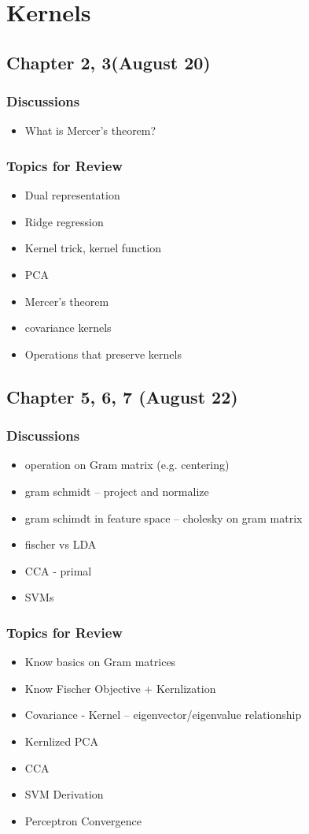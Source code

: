 \section{Kernels}

\subsection{Chapter 2, 3(August 20)}

\subsubsection*{Discussions}
\begin{itemize}
\item What is Mercer's theorem?
\end{itemize}

\subsubsection*{Topics for Review}
\begin{itemize}
\item Dual representation
\item Ridge regression
\item Kernel trick, kernel function
\item PCA
\item Mercer's theorem
\item covariance kernels
\item Operations that preserve kernels
\end{itemize}

\subsection{Chapter 5, 6, 7 (August 22)}

\subsubsection*{Discussions}
\begin{itemize}
\item operation on Gram matrix (e.g. centering)
\item gram schmidt -- project and normalize
\item gram schimdt in feature space -- cholesky on gram matrix
\item fischer vs LDA
\item CCA - primal
\item SVMs
\end{itemize}

\subsubsection*{Topics for Review}
\begin{itemize}
\item Know basics on Gram matrices
\item Know Fischer Objective + Kernlization
\item Covariance - Kernel -- eigenvector/eigenvalue relationship
\item Kernlized PCA
\item CCA
\item SVM Derivation
\item Perceptron Convergence
\end{itemize}
